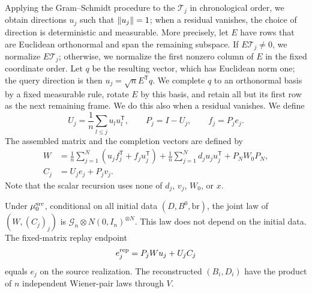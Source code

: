 Applying the Gram--Schmidt procedure to the $\mathcal T_j$ in chronological order,
we obtain directions $u_j$ such that $\lVert u_j\rVert=1$; when a residual vanishes,
the choice of direction is deterministic and measurable. More precisely, let $E$ have
rows that are Euclidean orthonormal and span the remaining subspace. If
$E\mathcal T_j\ne0$, we normalize $E\mathcal T_j$; otherwise, we
normalize the first nonzero column of $E$ in the fixed coordinate
order. Let $q$ be the resulting vector, which has Euclidean norm one; the query
direction is then $u_j=\sqrt n E^{\mathsf T}q$. We complete $q$ to an orthonormal basis
by a fixed measurable rule, rotate $E$ by this basis, and retain all but
its first row as the next remaining frame. We do this also when a
residual vanishes.
We define
\[
 U_j=\frac1n\sum_{l\le j}u_lu_l^{\mathsf T},\qquad
 P_j=I-U_j,\qquad f_j=P_je_j.
\]
The assembled matrix and the completion vectors are defined by
\begin{equation}\label{u:eq:assembled-matrix}
 \begin{aligned}
 W&=\frac1n\sum_{j=1}^N
       (u_jf_j^{\mathsf T}+f_ju_j^{\mathsf T})
       +\frac1n\sum_{j=1}^N d_ju_ju_j^{\mathsf T}+P_NW_0P_N,\\
 C_j&=U_je_j+P_jv_j.
 \end{aligned}
\end{equation}
Note that the scalar recursion uses none of $d_j$, $v_j$, $W_0$, or $x$.

\begin{lemma}
\label{u:lem:assembly}
Under $\mu^{\rm src}_0$, conditional on all initial data
$(D,B^0,\mathrm{br})$, the joint law of $(W,(C_j)_j)$ is
$\mathcal G_n\otimes N(0,I_n)^{\otimes N}$. This law does not depend
on the initial data. The fixed-matrix replay endpoint
\begin{equation}\label{u:eq:replay-endpoint}
 e_j^{\rm rep}=P_jWu_j+U_jC_j
\end{equation}
equals $e_j$ on the source realization. The reconstructed $(B_i,D_i)$
have the product of $n$ independent Wiener-pair laws through $V$.
\end{lemma}

